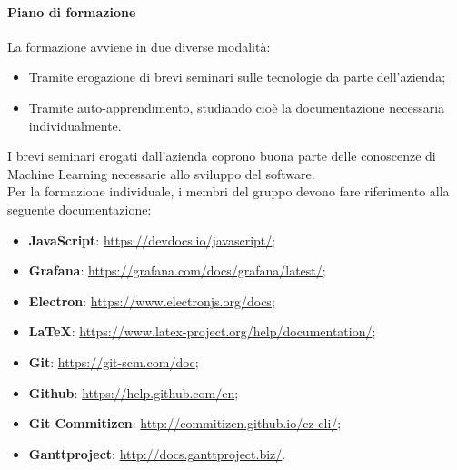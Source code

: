 \documentclass[../norme-di-progetto.tex]{subfiles}
\begin{document}
\paragraph{Piano di formazione}
La formazione avviene in due diverse modalità:
\begin{itemize}
  \item Tramite erogazione di brevi seminari sulle tecnologie da parte dell'azienda;
  \item Tramite auto-apprendimento, studiando cioè la documentazione necessaria individualmente.
\end{itemize}
I brevi seminari erogati dall'azienda coprono buona parte delle conoscenze di Machine Learning necessarie allo sviluppo del software. \\ Per la formazione individuale, i membri del gruppo devono fare riferimento alla seguente documentazione:
\begin{itemize}
  \item \textbf{JavaScript}: \href{https://devdocs.io/javascript/}{https://devdocs.io/javascript/};
  \item \textbf{Grafana}: \href{https://grafana.com/docs/grafana/latest/}{https://grafana.com/docs/grafana/latest/};
  \item \textbf{Electron}: \href{https://www.electronjs.org/docs}{https://www.electronjs.org/docs};
  \item \textbf{\LaTeX}: \href{https://www.latex-project.org/help/documentation/}{https://www.latex-project.org/help/documentation/};
  \item \textbf{Git}: \href{https://git-scm.com/doc}{https://git-scm.com/doc};
  \item \textbf{Github}: \href{https://help.github.com/en}{https://help.github.com/en};
  \item \textbf{Git Commitizen}: \href{http://commitizen.github.io/cz-cli/}{http://commitizen.github.io/cz-cli/};
  \item \textbf{Ganttproject}: \href{http://docs.ganttproject.biz/}{http://docs.ganttproject.biz/}.
\end{itemize}
\end{document}
